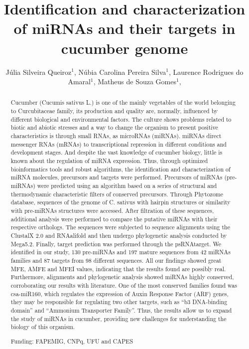 \documentclass[twoside]{article}
\title{\vspace{-15mm}\fontsize{24pt}{10pt}\selectfont\textbf{ Identification and characterization of miRNAs and their targets in cucumber genome }} %
\author{ Júlia Silveira Queiroz$^{1}$, Núbia Carolina Pereira Silva$^{1}$, Laurence Rodrigues do Amaral$^{1}$, Matheus de Souza Gomes$^{1}$, }
\affil{ 1 UFU

 }
\date{}
\begin{document}
  
  
  \maketitle %
  
  
  \thispagestyle{fancy} %
  
  
  \begin{abstract}
  Cucumber (Cucumis sativus L.) is one of the mainly vegetables of the world belonging to Curcubitaceae family, its production and quality are, normally, influenced by different biological and environmental factors. The culture shows problems related to biotic and abiotic stresses and a way to change the organism to present positive characteristics is through small RNAs, as microRNAs (miRNAs). miRNAs direct messenger RNAs (mRNAs) to transcriptional repression in different conditions and development stages. And despite the vast knowledge of cucumber biology, little is known about the regulation of miRNA expression. Thus, through optimized bioinformatics tools and robust algorithms, the identification and characterization of miRNA molecules, precursors and targets were performed. Precursors of miRNAs (pre-miRNAs) were predicted using an algorithm based on a series of structural and thermodynamic characteristic filters of conserved precursors. Through Phytozome database, sequences of the genome of C. sativus with hairpin structures or similarity with pre-miRNAs structures were accessed. After filtration of these sequences, additional analysis were performed to compare the putative miRNAs with their respective orthologs. The sequences were subjected to sequence alignments using the ClustalX 2.0 and RNAalifold and then undergo phylogenetic analysis conducted by Mega5.2. Finally, target prediction was performed through the psRNAtarget. We identified in our study, 130 pre-miRNAs and 197 mature sequences from 42 miRNAs families and 87 targets from 98 different sequences. All our findings showed great MFE, AMFE and MFEI values, indicating that the results found are possibly real. Furthermore, alignments and phylogenetic analysis showed miRNAs highly conserved, corroborating our results with literature. One of the most conserved families found was csa-miR160, which regulates the expression of Auxin Response Factor (ARF) genes, they may be responsible for regulating two other targets, such as “b3 DNA-binding domain” and “Ammonium Transporter Family”. Thus, the results allow us to expand the study of miRNAs in cucumber, providing new challenges for understanding the biology of this organism.
  
  Funding: FAPEMIG, CNPq, UFU and CAPES \\ 
  \end{abstract}
  
\end{document}
